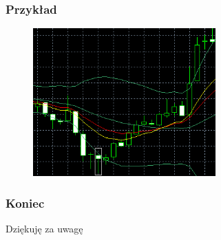 \documentclass{beamer}
\begin{document}

\begin{frame}
\frametitle{Przykład}
\begin{figure}[ht]
\begin{center}
\includegraphics[width=7cm]{sample.png}
\end{center}
\end{figure} 


\end{frame}


\begin{frame}
\frametitle{Koniec}
\begin{center}
Dziękuję za uwagę
\end{center}

\end{frame}

\end{document}
